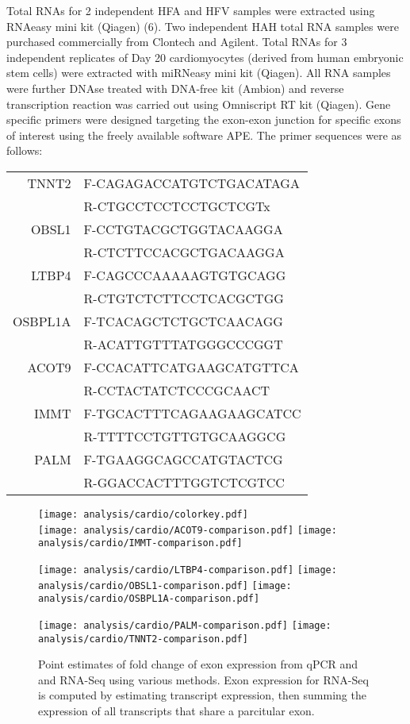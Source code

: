 \documentclass{article}
\begin{document}
Total RNAs for 2 independent HFA and HFV samples were extracted using RNAeasy
mini kit (Qiagen) (6). Two independent HAH total RNA samples were purchased
commercially from Clontech and Agilent. Total RNAs for 3 independent replicates
of Day 20 cardiomyocytes (derived from human embryonic stem cells) were
extracted with miRNeasy mini kit (Qiagen). All RNA samples were further DNAse
treated with DNA-free kit (Ambion) and reverse transcription reaction was
carried out using Omniscript RT kit (Qiagen). Gene specific primers were
designed targeting the exon-exon junction for specific exons of interest using
the freely available software APE. The primer sequences were as follows:

\begin{center}
\begin{tabular}{rl}
TNNT2   & F-CAGAGACCATGTCTGACATAGA \\
        & R-CTGCCTCCTCCTGCTCGTx \\
OBSL1   & F-CCTGTACGCTGGTACAAGGA \\
        & R-CTCTTCCACGCTGACAAGGA \\
LTBP4   & F-CAGCCCAAAAAGTGTGCAGG \\
        & R-CTGTCTCTTCCTCACGCTGG \\
OSBPL1A & F-TCACAGCTCTGCTCAACAGG \\
        & R-ACATTGTTTATGGGCCCGGT \\
ACOT9   & F-CCACATTCATGAAGCATGTTCA \\
        & R-CCTACTATCTCCCGCAACT \\
IMMT    & F-TGCACTTTCAGAAGAAGCATCC \\
        & R-TTTTCCTGTTGTGCAAGGCG \\
PALM    & F-TGAAGGCAGCCATGTACTCG \\
        & R-GGACCACTTTGGTCTCGTCC
\end{tabular}
\end{center}

\begin{figure}[H]
\centering
\texttt{[image: analysis/cardio/colorkey.pdf]} \\
\texttt{[image: analysis/cardio/ACOT9-comparison.pdf]}
\texttt{[image: analysis/cardio/IMMT-comparison.pdf]}
\end{figure}
\begin{figure}[H]
\ContinuedFloat
\centering
\texttt{[image: analysis/cardio/LTBP4-comparison.pdf]}
\texttt{[image: analysis/cardio/OBSL1-comparison.pdf]}
\texttt{[image: analysis/cardio/OSBPL1A-comparison.pdf]}
\end{figure}
\begin{figure}[H]
\ContinuedFloat
\centering
\texttt{[image: analysis/cardio/PALM-comparison.pdf]}
\texttt{[image: analysis/cardio/TNNT2-comparison.pdf]}
\caption{Point estimates of fold change of exon expression from qPCR and and
RNA-Seq using various methods. Exon expression for RNA-Seq is computed by
estimating transcript expression, then summing the expression of all transcripts
that share a parcitular exon.}
\label{fig:cardiofoldchange}
\end{figure}
\end{document}
